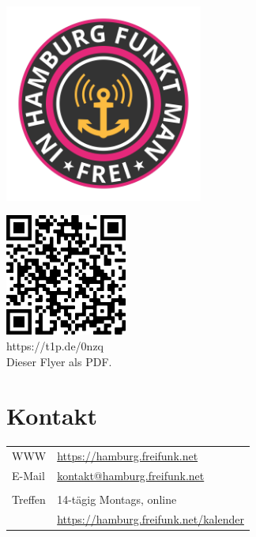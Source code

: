 \documentclass[10pt,a4paper,notumble]{leaflet}
\begin{document}
\newpage
\begin{center}
\includegraphics[width=65mm]{in-hamburg-funkt-man-frei.png}
\end{center}
\vspace{3em}
\begin{center}
\includegraphics[width=40mm]{qr.png}\\
\footnotesize https://t1p.de/0nzq\\Dieser Flyer als PDF.
\end{center}
\vfill
\section{Kontakt}
\begin{tabular}{ll}
WWW & \href{https://hamburg.freifunk.net}{https://hamburg.freifunk.net}\\
E-Mail & \href{mailto:kontakt@hamburg.freifunk.net}{kontakt@hamburg.freifunk.net}\\
        \\
Treffen & 14-tägig Montags, online\\
	& \href{https://hamburg.freifunk.net/kalender}{\small https://hamburg.freifunk.net/kalender}
\end{tabular}
\end{document}
